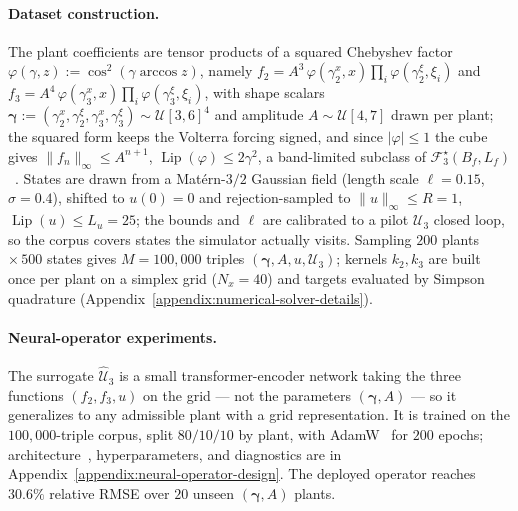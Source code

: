 \documentclass[twocolumn,amsthm]{autart}
\theoremstyle{plain}
\theoremstyle{definition}
\begin{document}
\vspace{-1.5\baselineskip}
\paragraph*{\normalfont\bfseries Dataset construction.}
\label{subsec:data}
The plant coefficients are tensor products of a squared Chebyshev factor $\varphi(\gamma, z) := \cos^2(\gamma \arccos z)$, namely $f_2 = A^3\,\varphi(\gamma_2^x, x)\prod_{i}\varphi(\gamma_2^\xi, \xi_i)$ and $f_3 = A^4\,\varphi(\gamma_3^x, x)\prod_i \varphi(\gamma_3^\xi, \xi_i)$, with shape scalars $\bm\gamma := (\gamma_2^x, \gamma_2^\xi, \gamma_3^x, \gamma_3^\xi) \sim \mathcal{U}[3,6]^4$ and amplitude $A \sim \mathcal{U}[4,7]$ drawn per plant; the squared form keeps the Volterra forcing signed, and since $|\varphi|\le1$ the cube gives $\|f_n\|_\infty \le A^{n+1}$, $\operatorname{Lip}(\varphi) \le 2\gamma^2$, a band-limited subclass of $\mathcal{F}_3^\star(B_f, L_f)$~\cite{Bhan2024Neural}. States are drawn from a Mat\'ern-$3/2$ Gaussian field (length scale $\ell = 0.15$, $\sigma = 0.4$), shifted to $u(0)=0$ and rejection-sampled to $\|u\|_\infty \le R = 1$, $\operatorname{Lip}(u) \le L_u = 25$; the bounds and $\ell$ are calibrated to a pilot $\mathcal{U}_3$ closed loop, so the corpus covers states the simulator actually visits. Sampling $200$ plants $\times\, 500$ states gives $M = 100{,}000$ triples $(\bm\gamma, A, u, \mathcal{U}_3)$; kernels $k_2, k_3$ are built once per plant on a simplex grid ($N_x = 40$) and targets evaluated by Simpson quadrature (Appendix~\ref{appendix:numerical-solver-details}).

\vspace{-1.5\baselineskip}
\paragraph*{\normalfont\bfseries Neural-operator experiments.}
\label{subsec:training}

The surrogate $\widehat{\mathcal{U}}_3$ is a small transformer-encoder network taking the three functions $(f_2, f_3, u)$ on the grid --- not the parameters $(\bm\gamma, A)$ --- so it generalizes to any admissible plant with a grid representation. It is trained on the $100{,}000$-triple corpus, split $80/10/10$ by plant, with AdamW~\cite{loshchilov2018decoupled} for $200$ epochs; architecture~\cite{Vaswani2017Attention,Hao2023GNOT,Jin2022MIONet}, hyperparameters, and diagnostics are in Appendix~\ref{appendix:neural-operator-design}. The deployed operator reaches $30.6\%$ relative RMSE over $20$ unseen $(\bm\gamma, A)$ plants.
\end{document}
